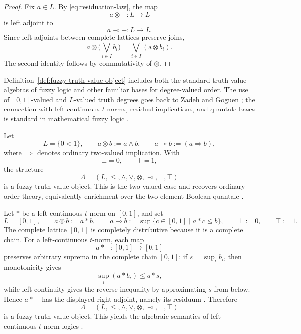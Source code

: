 \begin{proof}
    Fix \(a\in L\). By \eqref{eq:residuation-law}, the map
    \[
        a\otimes - : L\to L
    \]
    is left adjoint to
    \[
        a\multimap - : L\to L.
    \]
    Since left adjoints between complete lattices preserve joins,
    \[
        a\otimes \Big(\bigvee_{i\in I} b_i\Big)
        =
        \bigvee_{i\in I}(a\otimes b_i).
    \]
    The second identity follows by commutativity of \(\otimes\).
\end{proof}

Definition~\ref{def:fuzzy-truth-value-object} includes both the standard truth-value algebras of fuzzy logic and other familiar bases for degree-valued order. The use of \([0,1]\)-valued and \(L\)-valued truth degrees goes back to Zadeh and Goguen \cite{Zadeh1965FuzzySets,Goguen1967LFuzzySets}; the connection with left-continuous \(t\)-norms, residual implications, and quantale bases is standard in mathematical fuzzy logic \cite[Example~2.4]{stubbe-2014-quantaloid-enriched} \cite[Sections~1, 2, and~7]{sep-logic-fuzzy}.

\begin{example}\label{ex:crisp-quantale}
    Let
    \[
        L=\{0<1\},
        \qquad
        a\otimes b:=a\wedge b,
        \qquad
        a\multimap b:=(a\Rightarrow b),
    \]
    where \(\Rightarrow\) denotes ordinary two-valued implication. With
    \[
        \bot=0,
        \qquad
        \top=1,
    \]
    the structure
    \[
        \Lambda=(L,\leq,\wedge,\vee,\otimes,\multimap,\bot,\top)
    \]
    is a fuzzy truth-value object. This is the two-valued case and recovers ordinary order theory, equivalently enrichment over the two-element Boolean quantale
    \cite[Definition~2.2 and the paragraph following it]{stubbe-2014-quantaloid-enriched}.
\end{example}

\begin{example}
\label{ex:standard-tnorm-quantale}
    Let \(\ast\) be a left-continuous \(t\)-norm on \([0,1]\), and set
    \[
        L=[0,1],
        \qquad
        a\otimes b:=a\ast b,
        \qquad
        a\multimap b:=\sup\{c\in[0,1]\mid a\ast c\leq b\},
        \qquad
        \bot:=0,
        \qquad
        \top:=1.
    \]
    The complete lattice \([0,1]\) is completely distributive because it is a complete chain. For a left-continuous \(t\)-norm, each map
    \[
        a\ast-:[0,1]\to[0,1]
    \]
    preserves arbitrary suprema in the complete chain \([0,1]\): if \(s=\sup_i b_i\), then monotonicity gives
    \[
        \sup_i(a\ast b_i)\leq a\ast s,
    \]
    while left-continuity gives the reverse inequality by approximating \(s\) from below. Hence \(a\ast-\) has the displayed right adjoint, namely its residuum \cite[Example~2.4]{stubbe-2014-quantaloid-enriched}. Therefore
    \[
        \Lambda=(L,\leq,\wedge,\vee,\otimes,\multimap,\bot,\top)
    \]
    is a fuzzy truth-value object. This yields the algebraic semantics of left-continuous \(t\)-norm logics \cite[Sections~1, 2, and~7]{sep-logic-fuzzy} \cite{cintula-hajek-noguera-2011-hmfl1}.
\end{example}

